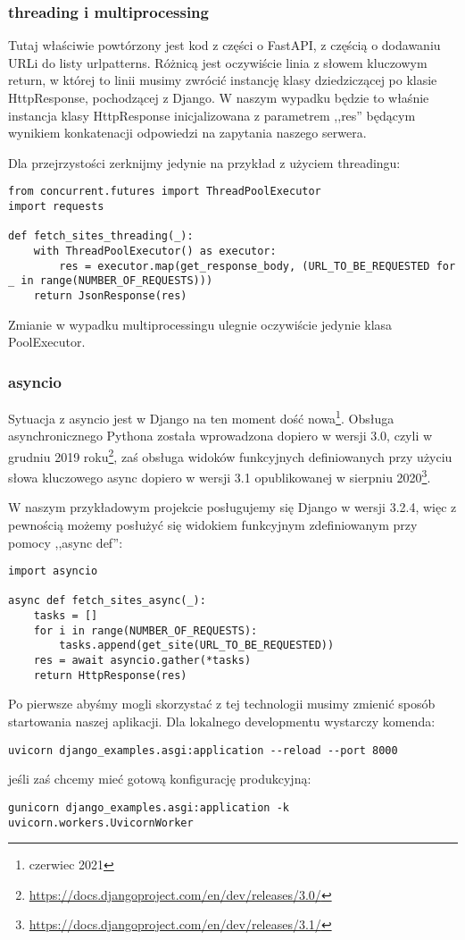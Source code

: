 \subsubsection{threading i multiprocessing}
Tutaj właściwie powtórzony jest kod z części o FastAPI, z częścią o dodawaniu URLi do listy urlpatterns. Różnicą jest oczywiście linia z słowem kluczowym return, w której to linii musimy zwrócić instancję klasy dziedziczącej po klasie HttpResponse, pochodzącej z Django. W naszym wypadku będzie to właśnie instancja klasy HttpResponse inicjalizowana z parametrem ,,res'' będącym wynikiem konkatenacji odpowiedzi na zapytania naszego serwera.

Dla przejrzystości zerknijmy jedynie na przykład z użyciem threadingu:
\begin{lstlisting}
from concurrent.futures import ThreadPoolExecutor
import requests

def fetch_sites_threading(_):
    with ThreadPoolExecutor() as executor:
        res = executor.map(get_response_body, (URL_TO_BE_REQUESTED for _ in range(NUMBER_OF_REQUESTS)))
    return JsonResponse(res)
\end{lstlisting}
Zmianie w wypadku multiprocessingu ulegnie oczywiście jedynie klasa PoolExecutor.

\subsubsection{asyncio}
Sytuacja z asyncio jest w Django na ten moment dość nowa\footnote{czerwiec 2021}. Obsługa asynchronicznego Pythona została wprowadzona dopiero w wersji 3.0, czyli w grudniu 2019 roku\footnote{\url{https://docs.djangoproject.com/en/dev/releases/3.0/}}, zaś obsługa widoków funkcyjnych definiowanych przy użyciu słowa kluczowego async dopiero w wersji 3.1 opublikowanej w sierpniu 2020\footnote{\url{https://docs.djangoproject.com/en/dev/releases/3.1/}}.

W naszym przykładowym projekcie posługujemy się Django w wersji 3.2.4, więc z pewnością możemy posłużyć się widokiem funkcyjnym zdefiniowanym przy pomocy ,,async def'':
\begin{lstlisting}
import asyncio

async def fetch_sites_async(_):
    tasks = []
    for i in range(NUMBER_OF_REQUESTS):
        tasks.append(get_site(URL_TO_BE_REQUESTED))
    res = await asyncio.gather(*tasks)
    return HttpResponse(res)
\end{lstlisting}
Po pierwsze abyśmy mogli skorzystać z tej technologii musimy zmienić sposób startowania naszej aplikacji. Dla lokalnego developmentu wystarczy komenda:
\begin{lstlisting}
uvicorn django_examples.asgi:application --reload --port 8000
\end{lstlisting}
jeśli zaś chcemy mieć gotową konfigurację produkcyjną:
\begin{lstlisting}
gunicorn django_examples.asgi:application -k uvicorn.workers.UvicornWorker
\end{lstlisting}

